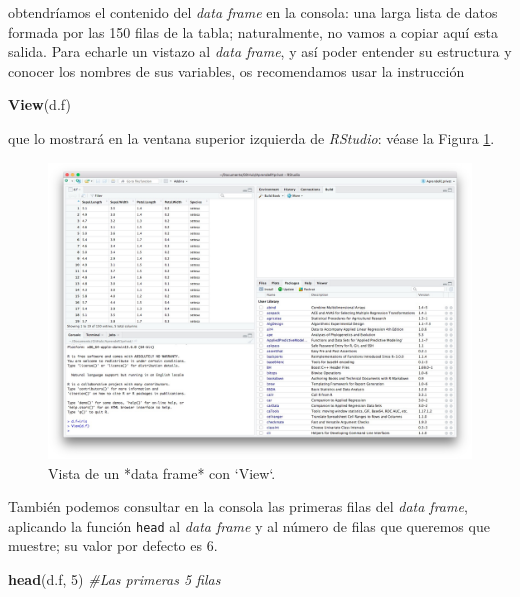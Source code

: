 \documentclass[]{book}
\newenvironment{Shaded}{\begin{snugshade}}{\end{snugshade}}
\newcommand{\CommentTok}[1]{\textcolor[rgb]{0.56,0.35,0.01}{\textit{#1}}}
\newcommand{\DecValTok}[1]{\textcolor[rgb]{0.00,0.00,0.81}{#1}}
\newcommand{\KeywordTok}[1]{\textcolor[rgb]{0.13,0.29,0.53}{\textbf{#1}}}
\newcommand{\NormalTok}[1]{#1}
\theoremstyle{definition}
\theoremstyle{definition}
\theoremstyle{definition}
\theoremstyle{remark}
\begin{document}
obtendríamos el contenido del \emph{data frame} en la consola: una larga lista de datos formada por las 150 filas de la tabla; naturalmente, no vamos a copiar aquí esta salida. Para echarle un vistazo al \emph{data frame}, y así poder entender su estructura y conocer los nombres de sus variables, os recomendamos usar la instrucción

\begin{Shaded}
\begin{Highlighting}[]
\KeywordTok{View}\NormalTok{(d.f)}
\end{Highlighting}
\end{Shaded}

que lo mostrará en la ventana superior izquierda de \emph{RStudio}:
véase la Figura \ref{fig:View}.

\begin{figure}

{\centering \includegraphics{AprendeR-Parte-I_files/figure-html/View} 

}

\caption{Vista de un *data frame* con `View`.}\label{fig:View}
\end{figure}

También podemos consultar en la consola las primeras filas del \emph{data frame}, aplicando la función \texttt{head} al \emph{data frame} y al número de filas que queremos que muestre; su valor por defecto es 6.

\begin{Shaded}
\begin{Highlighting}[]
\KeywordTok{head}\NormalTok{(d.f, }\DecValTok{5}\NormalTok{)  }\CommentTok{#Las primeras 5 filas}
\end{Highlighting}
\end{Shaded}
\end{document}
